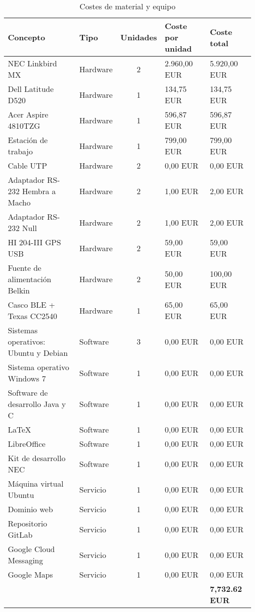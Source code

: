 \begin{table}
	\centering
	\caption{Costes de material y equipo}\label{tab:presupuestoMaterial}
	\begin{tabular}{llcll}
		\toprule
		\textbf{Concepto} & \textbf{Tipo} & \textbf{Unidades} & \textbf{Coste por unidad} & \textbf{Coste total} \\
		\midrule
		NEC Linkbird MX & Hardware & 2 & 2.960,00 EUR & 5.920,00 EUR \\
		Dell Latitude D520 & Hardware & 1 & 134,75 EUR & 134,75 EUR \\
		Acer Aspire 4810TZG & Hardware & 1 & 596,87 EUR & 596,87 EUR \\
		Estación de trabajo & Hardware & 1 & 799,00 EUR & 799,00 EUR \\
		Cable UTP & Hardware & 2 & 0,00 EUR & 0,00 EUR \\
		Adaptador RS-232 Hembra a Macho & Hardware & 2 & 1,00 EUR & 2,00 EUR \\
		Adaptador RS-232 Null & Hardware & 2 & 1,00 EUR & 2,00 EUR \\
		HI 204-III GPS USB & Hardware & 2 & 59,00 EUR & 59,00 EUR \\
		Fuente de alimentación Belkin & Hardware & 2 & 50,00 EUR & 100,00 EUR \\
		Casco BLE + Texas CC2540 & Hardware & 1 & 65,00 EUR & 65,00 EUR \\
		Sistemas operativos: Ubuntu y Debian & Software & 3 & 0,00 EUR & 0,00 EUR \\	
		Sistema operativo Windows 7 & Software & 1 & 0,00 EUR & 0,00 EUR \\
		Software de desarrollo Java y C & Software & 1 & 0,00 EUR & 0,00 EUR \\
		LaTeX & Software & 1 & 0,00 EUR & 0,00 EUR \\
		LibreOffice & Software & 1 & 0,00 EUR & 0,00 EUR \\
		Kit de desarrollo NEC & Software & 1 & 0,00 EUR & 0,00 EUR \\
		Máquina virtual Ubuntu & Servicio & 1 & 0,00 EUR & 0,00 EUR \\
		Dominio web & Servicio & 1 & 0,00 EUR & 0,00 EUR \\
		Repositorio GitLab & Servicio & 1 & 0,00 EUR & 0,00 EUR \\
		Google Cloud Messaging & Servicio & 1 & 0,00 EUR & 0,00 EUR \\
		Google Maps & Servicio & 1 & 0,00 EUR & 0,00 EUR \\
		& & & & \textbf{7,732.62 EUR}\\		
		\bottomrule
	\end{tabular}
\end{table}
